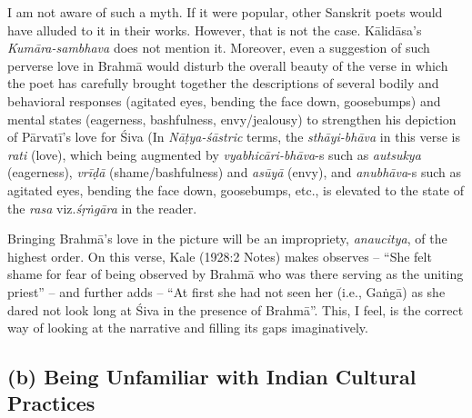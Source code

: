 I am not aware of such a myth. If it were popular, other Sanskrit poets would have alluded to it in their works. However, that is not the case. Kālidāsa’s \textsl{Kumāra-sambhava} does not mention it. Moreover, even a suggestion of such perverse love in Brahmā would disturb the overall beauty of the verse in which the poet has carefully brought together the descriptions of several bodily and behavioral responses (agitated eyes, bending the face down, goosebumps) and mental states (eagerness, bashfulness, envy/jealousy) to strengthen his depiction of Pārvatī’s love for Śiva (In \textsl{Nāṭya-śāstric} terms, the \textsl{sthāyi-bhāva} in this verse is \textsl{rati} (love), which being augmented by \hbox{\textsl{vyabhicāri-bhāva}-s} such as \textsl{autsukya} (eagerness), \textsl{vrīḍā} (shame/bashfulness) and \textsl{asūyā} (envy), and \textsl{anubhāva}-s such as agitated eyes, bending the face down, goosebumps, etc., is elevated to the state of the \textsl{rasa} viz.\@ \textsl{śṛṅgāra} in the reader. 

Bringing Brahmā’s love in the picture will be an impropriety, \textsl{anaucitya}, of the highest order. On this verse, Kale (1928:2 Notes) makes observes -- “She felt shame for fear of being observed by Brahmā who was there serving as the uniting priest” -- and further adds -- “At first she had not seen her (i.e., Gaṅgā) as she dared not look long at Śiva
 in the presence of Brahmā”. This, I feel, is the correct way of looking at the narrative and filling its gaps imaginatively.\\[-20pt]

\subsection*{(b) Being Unfamiliar with Indian Cultural Practices}

